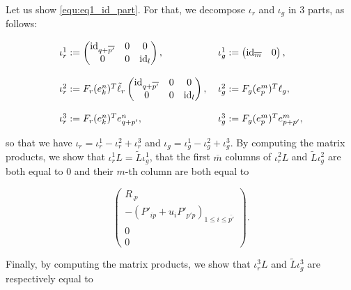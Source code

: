 \documentclass{ifacconf}
\newcommand\id[1]{\text{id}_{#1}}
\begin{document}
Let us show \eqref{equ:eq1_id_part}. For that, we decompose $\iota_r$ and
$\iota_g$ in $3$ parts, as follows:
\begin{small}
  \[
  \begin{tabular}{l l}
    $\iota_r^1:= \begin{pmatrix}
      \id{q+\overline{p'}} & 0 & 0\\
      0 & 0 & \id{l}
    \end{pmatrix},$ & $\iota_g^1:= \begin{pmatrix}
      \id{\overline{m}} & 0
    \end{pmatrix},$
     \\
    & \\
    $\iota_r^2:= F_r(e^n_{k})^T\tilde{\ell}_r\begin{pmatrix}
    \id{q+\overline{p'}} & 0 & 0\\
    0 & 0 & \id{l}
     \end{pmatrix},$ &
     $\iota_g^2:= F_g(e^m_p)^T\ell_g,$
      \\
    & \\
    $\iota_r^3:= F_r(e^n_{k})^Te^n_{q+p'},$ &
    $\iota_g^3:= F_g(e^m_p)^Te^m_{p+p'},$
  \end{tabular}
  \]
\end{small}
so that we have $\iota_r=\iota_r^1-\iota_r^2+\iota_r^3$ and $\iota_g=
\iota_g^1-\iota_g^2+\iota_g^3$. By computing the matrix products, we show
that $\iota_r^1L=\tilde{L}\iota_g^1$, that the first $\overline{m}$
columns of $\iota_r^2L$ and $\tilde{L}\iota_g^2$ are both equal to $0$
and their $m$-th column are both equal to
\begin{small}
  \[\begin{pmatrix}
  R_{.p}\\
  -\left(P'_{ip}+u_iP'_{p'p}\right)_{1\leq i\leq\overline{p'}}\\
  0\\
  0
  \end{pmatrix}.\]
\end{small}
Finally, by computing the matrix products, we show that $\iota_r^3L$ and
$\tilde{L}\iota_g^3$ are respectively equal to
\end{document}
